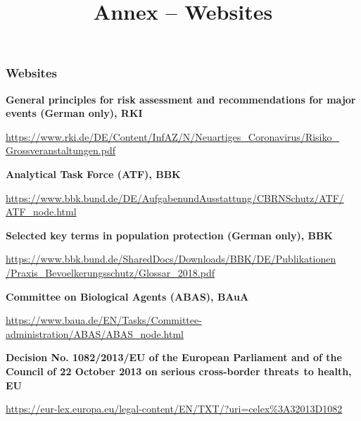 \documentclass{article}
\begin{document}
\title{Annex – Websites}

\maketitle


\subsubsection{Websites}\label{H8354250}



\textbf{General principles for risk assessment and recommendations for major events (German only), RKI}


\href{https://www.rki.de/DE/Content/InfAZ/N/Neuartiges_Coronavirus/Risiko_Grossveranstaltungen.pdf?__blob=publicationFile}{https://www.rki.de/DE/Content/InfAZ/N/Neuartiges\_Coronavirus/Risiko\_} \href{https://www.rki.de/DE/Content/InfAZ/N/Neuartiges_Coronavirus/Risiko_Grossveranstaltungen.pdf?__blob=publicationFile}{Grossveranstaltungen.pdf}


\textbf{Analytical Task Force (ATF), BBK}


\href{https://www.bbk.bund.de/DE/AufgabenundAusstattung/CBRNSchutz/ATF/ATF_node.html}{https://www.bbk.bund.de/DE/AufgabenundAusstattung/CBRNSchutz/ATF/} \href{https://www.bbk.bund.de/DE/AufgabenundAusstattung/CBRNSchutz/ATF/ATF_node.html}{ATF\_node.html}


\textbf{Selected key terms in population protection (German only), BBK}


\href{https://www.bbk.bund.de/SharedDocs/Downloads/BBK/DE/Publikationen/Praxis_Bevoelkerungsschutz/Glossar_2018.pdf}{https://www.bbk.bund.de/SharedDocs/Downloads/BBK/DE/Publikationen} \href{https://www.bbk.bund.de/SharedDocs/Downloads/BBK/DE/Publikationen/Praxis_Bevoelkerungsschutz/Glossar_2018.pdf}{/Praxis\_Bevoelkerungsschutz/Glossar\_2018.pdf}


\textbf{Committee on Biological Agents (ABAS), BAuA}


\href{https://www.baua.de/EN/Tasks/Committee-administration/ABAS/ABAS_node.html}{https://www.baua.de/EN/Tasks/Committee-administration/ABAS/ABAS\_node.html}


\textbf{Decision No. 1082/2013/EU of the European Parliament and of the Council of 22 October 2013 on serious cross-border threats} \textbf{to health, EU }


\href{https://eur-lex.europa.eu/legal-content/EN/TXT/?uri=celex%3A32013D1082}{https://eur-lex.europa.eu/legal-content/EN/TXT/?uri=celex\%3A32013D1082}
\end{document}
